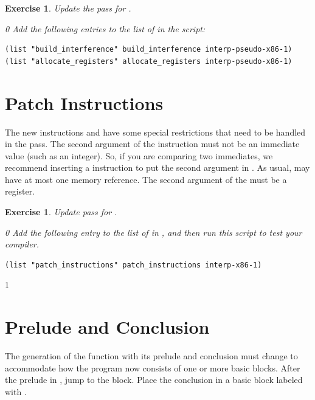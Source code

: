 \documentclass[7x10]{TimesAPriori_MIT}%
\def\racketEd{0}
\def\pythonEd{1}
\def\edition{0}
\newtheorem{exercise}[theorem]{Exercise}
\numberwithin{theorem}{chapter}
\numberwithin{definition}{chapter}
\numberwithin{equation}{chapter}
\begin{document}
\begin{exercise}\normalfont\normalsize
Update the  pass for \LangXIfVar{}.
{\if\edition\racketEd
Add the following entries to the list of  in the
 script:
\begin{lstlisting}
(list "build_interference" build_interference interp-pseudo-x86-1)
(list "allocate_registers" allocate_registers interp-pseudo-x86-1)
\end{lstlisting}
\fi}
\end{exercise}


\section{Patch Instructions}

The new instructions  and  have some special
restrictions that need to be handled in the 
pass.
%
The second argument of the  instruction must not be an
immediate value (such as an integer). So, if you are comparing two
immediates, we recommend inserting a  instruction to put the
second argument in . As usual,  may have at most
one memory reference.
%
The second argument of the  must be a register.

\begin{exercise}\normalfont\normalsize
%
Update  pass for \LangXIfVar{}.
%  
{\if\edition\racketEd
Add the following entry to the list of  in
, and then run this script to test your compiler.
\begin{lstlisting}
(list "patch_instructions" patch_instructions interp-x86-1)
\end{lstlisting}
\fi}
\end{exercise}


{\if\edition\pythonEd
  
\section{Prelude and Conclusion}
\label{sec:prelude-conclusion-cond}

The generation of the  function with its prelude and
conclusion must change to accommodate how the program now consists of
one or more basic blocks. After the prelude in , jump to
the  block. Place the conclusion in a basic block labeled
with .

\fi}
\end{document}
